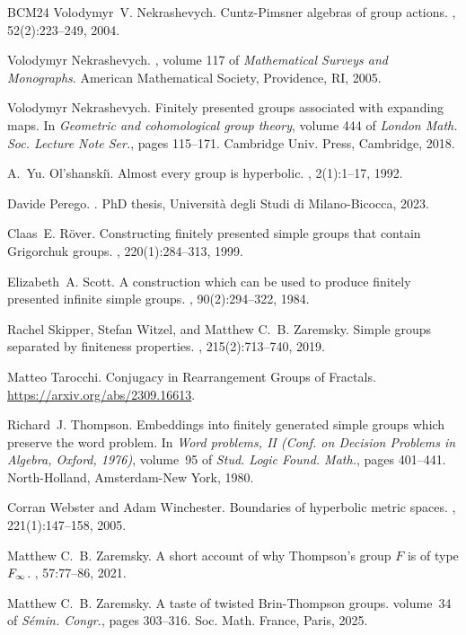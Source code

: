 \documentclass[11pt,letterpaper]{amsart}
\theoremstyle{definition}
\begin{document}
\begin{thebibliography}{BCM{\etalchar{+}}24}
Volodymyr~V. Nekrashevych.
\newblock Cuntz-{P}imsner algebras of group actions.
, 52(2):223--249, 2004.

Volodymyr Nekrashevych.
, volume 117 of {\em Mathematical Surveys
  and Monographs}.
\newblock American Mathematical Society, Providence, RI, 2005.

Volodymyr Nekrashevych.
\newblock Finitely presented groups associated with expanding maps.
\newblock In {\em Geometric and cohomological group theory}, volume 444 of {\em
  London Math. Soc. Lecture Note Ser.}, pages 115--171. Cambridge Univ. Press,
  Cambridge, 2018.

A.~Yu. Ol'shanski\u\i.
\newblock Almost every group is hyperbolic.
, 2(1):1--17, 1992.

Davide Perego.
.
\newblock PhD thesis, Universit\`a degli {S}tudi di {M}ilano-{B}icocca, 2023.

Claas~E. R{\"{o}}ver.
\newblock Constructing finitely presented simple groups that contain
  {G}rigorchuk groups.
, 220(1):284--313, 1999.

Elizabeth~A. Scott.
\newblock A construction which can be used to produce finitely presented
  infinite simple groups.
, 90(2):294--322, 1984.

Rachel Skipper, Stefan Witzel, and Matthew C.~B. Zaremsky.
\newblock Simple groups separated by finiteness properties.
, 215(2):713--740, 2019.

Matteo Tarocchi.
\newblock Conjugacy in {R}earrangement {G}roups of {F}ractals.
\newblock \url{https://arxiv.org/abs/2309.16613}.

Richard~J. Thompson.
\newblock Embeddings into finitely generated simple groups which preserve the
  word problem.
\newblock In {\em Word problems, {II} ({C}onf. on {D}ecision {P}roblems in
  {A}lgebra, {O}xford, 1976)}, volume~95 of {\em Stud. Logic Found. Math.},
  pages 401--441. North-Holland, Amsterdam-New York, 1980.

Corran Webster and Adam Winchester.
\newblock Boundaries of hyperbolic metric spaces.
, 221(1):147--158, 2005.

Matthew C.~B. Zaremsky.
\newblock A short account of why {T}hompson's group {$F$} is of type {$\rm
  F_\infty$}.
, 57:77--86, 2021.

Matthew C.~B. Zaremsky.
\newblock A taste of twisted {B}rin-{T}hompson groups.
\newblock volume~34 of {\em S\'emin. Congr.}, pages 303--316. Soc. Math.
  France, Paris, 2025.

\end{thebibliography}
\end{document}
